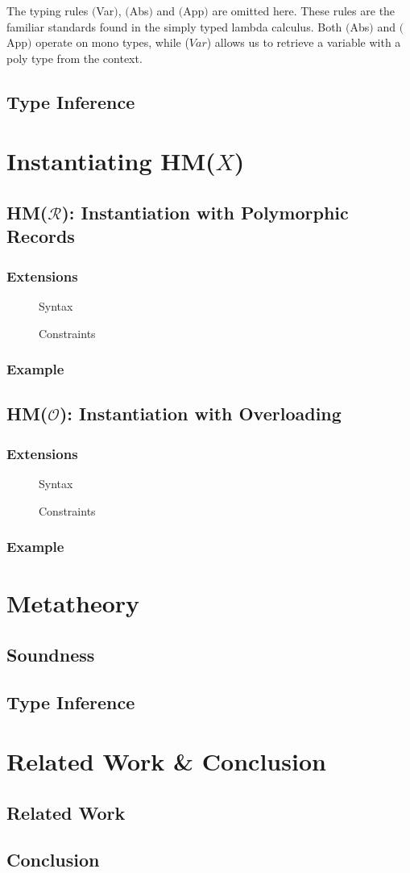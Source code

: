 \documentclass[runningheads]{llncs}
\newcommand{\hmx}{HM($X$)}
\newcommand{\hmr}{HM($\mathcal{R}$)}
\newcommand{\hmo}{HM($\mathcal{O}$)}
\begin{document}
The typing rules $($Var$)$, $($Abs$)$ and $($App$)$ are omitted here.
These rules are the familiar standards found in the simply typed lambda
calculus.
Both $($Abs$)$ and $($App$)$ operate on mono types, while ($Var$) allows us to
retrieve a variable with a
poly type from the context.
\subsection{Type Inference}
\section{Instantiating \hmx{}}
\subsection{\hmr{}: Instantiation with Polymorphic Records}
\subsubsection{Extensions}
\begin{figure}[t]
  \centering
  \caption{Syntax}
\end{figure}
\begin{figure}[t]
  \centering
  \caption{Constraints}
\end{figure}
\subsubsection{Example}
\subsection{\hmo{}: Instantiation with Overloading}
\subsubsection{Extensions}
\begin{figure}[t]
  \centering
  \caption{Syntax}
\end{figure}
\begin{figure}[t]
  \centering
  \caption{Constraints}
\end{figure}
\subsubsection{Example}
\section{Metatheory}
\subsection{Soundness}
\subsection{Type Inference}
\section{Related Work \& Conclusion}
\subsection{Related Work}
\subsection{Conclusion}

\nocite{hmx}
\nocite{sts}
\nocite{atapl}
\printbibliography{}
\end{document}
